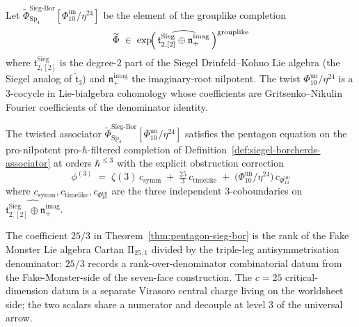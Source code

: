 \begin{definition}
\label{def:siegel-borcherds-associator}
Let $\widetilde{\Phi}^{\mathrm{Sieg\text{-}Bor}}_{\mathrm{Sp}_4}[\Phi_{10}^{\mathrm{un}}/\eta^{24}]$
be the element of the grouplike completion
\[
 \widetilde{\Phi} \;\in\;
 \exp\!\Bigl(
 \widehat{\,\mathfrak{t}^{\mathrm{Sieg}}_{2,[2]}
 \oplus \mathfrak{n}_+^{\mathrm{imag}}\,}
 \Bigr)^{\mathrm{grouplike}}
\]
where $\mathfrak{t}^{\mathrm{Sieg}}_{2,[2]}$ is the degree-$2$ part of the Siegel
Drinfeld--Kohno Lie algebra (the Siegel analog of $\widehat{\mathfrak{t}}_3$) and
$\mathfrak{n}_+^{\mathrm{imag}}$ the imaginary-root nilpotent. The twist
$\Phi_{10}^{\mathrm{un}}/\eta^{24}$ is a $3$-cocycle in Lie-bialgebra cohomology whose coefficients
are Gritsenko--Nikulin Fourier coefficients of the denominator identity.
\end{definition}

\begin{theorem}
\label{thm:pentagon-sieg-bor}
The twisted associator $\widetilde{\Phi}^{\mathrm{Sieg\text{-}Bor}}_{\mathrm{Sp}_4}[\Phi_{10}^{\mathrm{un}}/\eta^{24}]$
satisfies the pentagon equation on the pro-nilpotent pro-$\hbar$-filtered completion
of Definition~\ref{def:siegel-borcherds-associator} at orders $\hbar^{\leq 3}$ with
the explicit obstruction correction
\[
 \phi^{(3)}
 \;=\;
 \zeta(3)\,c_{\mathrm{symm}}
 \;+\;
 \tfrac{25}{3}\,c_{\mathrm{timelike}}
 \;+\;
 \bigl(\Phi_{10}^{\mathrm{un}}/\eta^{24}\bigr)\, c_{\Phi_{10}^{\mathrm{un}}}
\]
where $c_{\mathrm{symm}}, c_{\mathrm{timelike}}, c_{\Phi_{10}^{\mathrm{un}}}$ are the three
independent $3$-coboundaries on $\widehat{\mathfrak{t}^{\mathrm{Sieg}}_{2,[2]}
\oplus \mathfrak{n}_+^{\mathrm{imag}}}$.
\end{theorem}

\begin{remark}
\label{rem:25-thirds}
The coefficient $25/3$ in Theorem~\ref{thm:pentagon-sieg-bor} is the
rank of the Fake Monster Lie algebra Cartan $\mathrm{II}_{25, 1}$
divided by the triple-leg antisymmetrisation denominator: $25/3$
records a rank-over-denominator combinatorial datum from the
Fake-Monster-side of the seven-face construction. The $c = 25$
critical-dimension datum is a separate Virasoro central charge living
on the worldsheet side; the two scalars share a numerator and decouple
at level $3$ of the universal arrow.
\end{remark}

